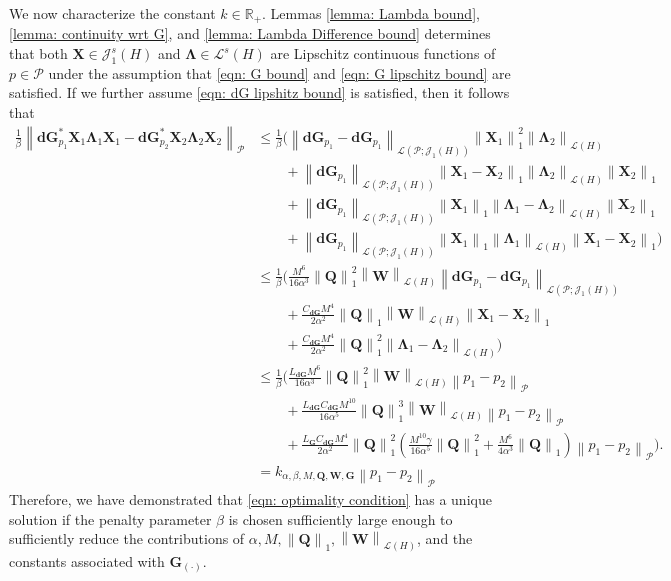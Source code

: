 \documentclass{amsart}
\newcommand{\sL}{\mathscr L}
\newcommand{\sJ}{\mathscr J}
\newcommand{\p}[1]{\left( {#1} \right)}
\newcommand{\norm}[1]{\left\| #1 \right\|}
\newcommand{\sP}{\mathcal{P}}
\newcommand{\bX}{\mathbf X}
\newcommand{\bQ}{\mathbf Q}
\newcommand{\bG}{\mathbf G}
\newcommand{\bLambda}{\boldsymbol{\Lambda}}
\newcommand{\bd}{\mathbf d}
\newcommand{\bW}{\mathbf W}
\begin{document}
We now characterize the constant $k\in \mathbb R_+$. Lemmas \ref{lemma: Lambda bound}, \ref{lemma: continuity wrt G}, and \ref{lemma: Lambda Difference bound} determines that both $\bX\in \sJ_1^s(H)$ and $\bLambda\in \sL^s(H)$ are Lipschitz continuous functions of $p \in \sP$ under the assumption that \eqref{eqn: G bound} and \eqref{eqn: G lipschitz bound} are satisfied. If we further assume \eqref{eqn: dG lipshitz bound} is satisfied, then it follows that
$$
\begin{aligned}
    \frac{1}{\beta}
    \norm{\bd\bG_{p_1}^*\bX_1 \bLambda_1 \bX_1 - \bd\bG_{p_2}^*\bX_2 \bLambda_2 \bX_2 }_{\sP} &\leq 
    \frac{1}{\beta}
    \bigg(
    \norm{\bd\bG_{p_1} - \bd\bG_{p_1}}_{\sL(\sP; \sJ_1(H))}
    \norm{\bX_1}^2_{1}\norm{\bLambda_2}_{\sL(H)} \\
    &\qquad + 
    \norm{\bd\bG_{p_1}}_{\sL\p{\sP; \sJ_1(H)}}
    \norm{\bX_1-\bX_2}_1 \norm{\bLambda_2}_{\sL(H)}
    \norm{\bX_2}_1 \\
    &\qquad +
    \norm{\bd\bG_{p_1}}_{\sL(\sP;\sJ_1(H))}
    \norm{\bX_1}_1\norm{\bLambda_1 - \bLambda_2}_{\sL(H)}\norm{\bX_2}_1\\
    &\qquad+ 
    \norm{\bd\bG_{p_1}}_{\sL\p{\sP; \sJ_1(H) }}
    \norm{\bX_1}_1
    \norm{\bLambda_1}_{\sL(H)}
    \norm{\bX_1 - \bX_2}_1
    \bigg) \\
    &\leq \frac{1}{\beta}
    \bigg(
        \frac{M^6}{16\alpha^3}
        \norm{\bQ}_1^2\norm{\bW}_{\sL(H)}
        \norm{\bd\bG_{p_1} - \bd\bG_{p_1}}_{\sL(\sP; \sJ_1(H))}\\
    &\qquad + \frac{C_{\bd\bG}M^4}{2\alpha^2}\norm{\bQ}_1 \norm{\bW}_{\sL(H)}\norm{\bX_1 - \bX_2}_1 \\
    &\qquad + \frac{C_{\bd\bG}M^4}{2\alpha^2}\norm{\bQ}_1^2 \norm{\bLambda_1 - \bLambda_2}_{\sL(H)}
        \bigg) \\
    &\leq\frac{1}{\beta}
    \bigg(
         \frac{L_{\bd\bG}M^6}{16\alpha^3}
        \norm{\bQ}_1^2\norm{\bW}_{\sL(H)}
        \norm{p_1 - p_2}_\sP\\
         &\qquad + \frac{L_{\bd\bG}C_{\bd\bG}M^{10}}{16\alpha^5}\norm{\bQ}_1^3 \norm{\bW}_{\sL(H)}\norm{p_1 - p_2}_\sP \\
         &\qquad + 
         \frac{L_{\bG}C_{\bd\bG}M^4}{2\alpha^2}\norm{\bQ}_1^2 
          \p{\frac{M^{10}\gamma}{16\alpha^5}\norm{\bQ}^2_1 
        + \frac{M^6}{4\alpha^3}\norm{\bQ}_1 }
        \norm{p_1 - p_2}_\sP\bigg). \\
        &= k_{\alpha, \beta, M, \bQ, \bW, \bG} \norm{p_1 - p_2}_{\sP}
\end{aligned}
$$
Therefore, we have demonstrated that \eqref{eqn: optimality condition} has a unique solution if the penalty parameter $\beta$ is chosen sufficiently large enough to sufficiently reduce the contributions of $\alpha, M, \norm{\bQ}_1,\norm{\bW}_{\sL\p{H}}$, and the constants associated with $\bG_{\p{\cdot}}$. 
\end{document}
